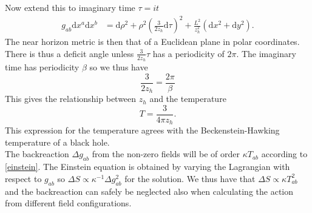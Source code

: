 \documentclass[12pt]{report}
\renewcommand{\d}{\ensuremath{\mathrm{d}}}
\renewcommand{\i}{\ensuremath{i}}
\begin{document}
Now extend this to imaginary time $\tau=\i t$
\begin{equation}
\begin{split}
 g_{ab}\d x^a\d x^b
&= \d \rho^2 +\rho^2\left(\frac{3}{2z_h}\d \tau\right)^2+\frac{L^2}{z_h^2}\left(\d x^2+\d y^2\right).
\end{split}
\end{equation}
The near horizon metric is then that of a Euclidean plane in polar coordinates. There is thus a deficit angle unless $\frac{3}{2z_h}\tau$ has a periodicity of $2\pi$. The imaginary time has periodicity $\beta$ so we thus have
\begin{equation}
 \frac{3}{2z_h}=\frac{2\pi}{\beta}
\end{equation}
This gives the relationship between $z_h$ and the temperature
\begin{equation}
 T=\frac{3}{4\pi  z_h}\label{T}.
\end{equation}
This expression for the temperature agrees with the Beckenstein-Hawking temperature of a black hole.\\
The backreaction $\Delta g_{ab}$ from the non-zero fields will be of order $\kappa T_{ab}$ according to \eqref{einstein}. The Einstein equation is obtained by varying the Lagrangian with respect to $g_{ab}$ so $\Delta S\propto\kappa^{-1}\Delta g_{ab}^2$ for the solution. We thus have that $\Delta S\propto\kappa T_{ab}^2$ and the backreaction can safely be neglected also when calculating the action from different field configurations.\\
\end{document}

